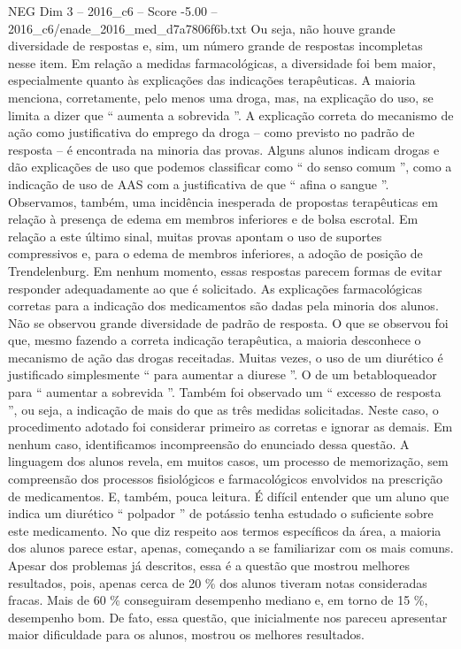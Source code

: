 \begin{textsample}{NEG Dim 3 – 2016\_c6 – Score -5.00 – 2016\_c6/enade\_2016\_med\_d7a7806f6b.txt}
Ou seja, não houve grande diversidade de respostas e, sim, um número grande de respostas incompletas nesse item.
Em relação a medidas farmacológicas, a diversidade foi bem maior, especialmente quanto às explicações das indicações terapêuticas.
A maioria menciona, corretamente, pelo menos uma droga, mas, na explicação do uso, se limita a dizer que “ aumenta a sobrevida ”.
A explicação correta do mecanismo de ação como justificativa do emprego da droga – como previsto no padrão de resposta – é encontrada na minoria das provas.
Alguns alunos indicam drogas e dão explicações de uso que podemos classificar como “ do senso comum ”, como a indicação de uso de AAS com a justificativa de que “ afina o sangue ”.
Observamos, também, uma incidência inesperada de propostas terapêuticas em relação à presença de edema em membros inferiores e de bolsa escrotal.
Em relação a este último sinal, muitas provas apontam o uso de suportes compressivos e, para o edema de membros inferiores, a adoção de posição de Trendelenburg.
Em nenhum momento, essas respostas parecem formas de evitar responder adequadamente ao que é solicitado.
As explicações farmacológicas corretas para a indicação dos medicamentos são dadas pela minoria dos alunos.
Não se observou grande diversidade de padrão de resposta.
O que se observou foi que, mesmo fazendo a correta indicação terapêutica, a maioria desconhece o mecanismo de ação das drogas receitadas.
Muitas vezes, o uso de um diurético é justificado simplesmente “ para aumentar a diurese ”.
O de um betabloqueador para “ aumentar a sobrevida ”.
Também foi observado um “ excesso de resposta ”, ou seja, a indicação de mais do que as três medidas solicitadas.
Neste caso, o procedimento adotado foi considerar primeiro as corretas e ignorar as demais.
Em nenhum caso, identificamos incompreensão do enunciado dessa questão.
A linguagem dos alunos revela, em muitos casos, um processo de memorização, sem compreensão dos processos fisiológicos e farmacológicos envolvidos na prescrição de medicamentos.
E, também, pouca leitura.
É difícil entender que um aluno que indica um diurético “ polpador ” de potássio tenha estudado o suficiente sobre este medicamento.
No que diz respeito aos termos específicos da área, a maioria dos alunos parece estar, apenas, começando a se familiarizar com os mais comuns.
Apesar dos problemas já descritos, essa é a questão que mostrou melhores resultados, pois, apenas cerca de 20 \% dos alunos tiveram notas consideradas fracas.
Mais de 60 \% conseguiram desempenho mediano e, em torno de 15 \%, desempenho bom.
De fato, essa questão, que inicialmente nos pareceu apresentar maior dificuldade para os alunos, mostrou os melhores resultados.

\end{textsample}
